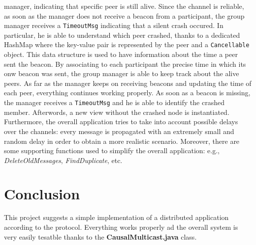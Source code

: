 \documentclass[conference]{IEEEtran}
\begin{document}
manager, indicating that specific peer is still alive. 
Since the channel is reliable, as soon as the manager does not receive 
a beacon from a participant, the group manager receives a
\texttt{TimeoutMsg} indicating that a silent crash occured. 
In particular, he is able to understand which peer crashed, thanks to 
a dedicated HashMap where the key-value pair
is represented by the peer and a \texttt{Cancellable} object.
This data structure is used to have information about the time a peer
sent the beacon. By associating to each participant the precise time in which
its onw beacon was sent, the group manager is able to keep track about the alive peers.
As far as the manager keeps on receiving beacons and updating the time of each peer, 
everything continues working properly. As soon as a beacon is missing, the manager
receives a \texttt{TimeoutMsg} and he is able to identify the crashed member.
Afterwords, a new view without the crashed node is instantiated.\\
Furthermore, the overall application tries to take into account possible 
delays over the channels: every message is propagated with an extremely small and 
random delay in order to obtain a more realistic scenario. 
Moreover, there are some supporting functions used to simplify the overall
application: e.g., \textit{DeleteOldMessages}, \textit{FindDuplicate}, etc.

\section{Conclusion}
This project suggests a simple implementation of a distributed application
according to the protocol. Everything works properly ad the overall system
is very easily tesatble thanks to the \textbf{CausalMulticast.java} class. 

\end{document}
